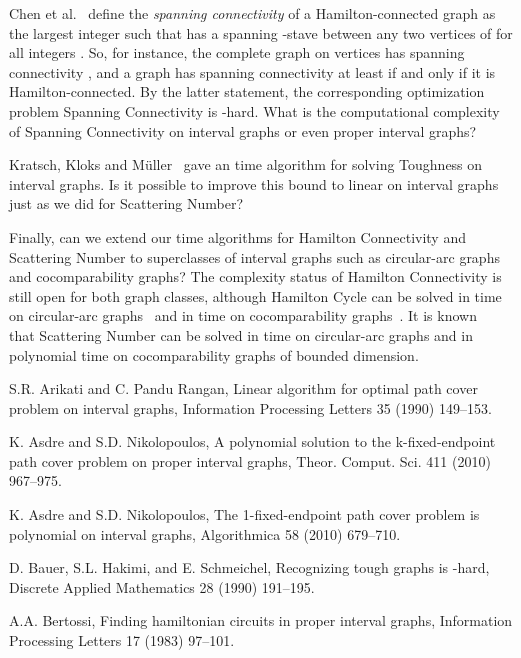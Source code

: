 \documentclass{llncs}
\begin{document}
\begin{theorem}
Chen et al.~\cite{CCLLW} define the {\em spanning connectivity\/} of a Hamilton-connected graph  as the largest integer  such that  has a spanning -stave between any two vertices of  for all integers . So, for instance, the complete graph on  vertices has spanning connectivity , and a graph has spanning connectivity at least  if and only if it is Hamilton-connected.
By the latter statement, the corresponding optimization problem {\sc Spanning Connectivity} is -hard.
What is the computational complexity of {\sc Spanning Connectivity} on interval graphs or even proper interval graphs?

Kratsch, Kloks and M\"uller~\cite{KKM94} gave an  time algorithm for solving {\sc Toughness} on interval graphs. Is it possible to improve this bound to linear on interval graphs just as we did for 
{\sc Scattering Number}?

Finally, can we extend our  time algorithms for {\sc Hamilton Connectivity} and {\sc Scattering Number} to superclasses of interval graphs such as circular-arc graphs and cocomparability graphs? 
The complexity status of {\sc Hamilton Connectivity} is still open for both graph classes, although {\sc Hamilton Cycle} can be solved in  time on circular-arc graphs~\cite{SCH92} and in  time on cocomparability graphs~\cite{DS94}. It is known~\cite{KKM94} that {\sc Scattering Number} can be solved in  time on circular-arc graphs and in polynomial time on cocomparability graphs of bounded dimension.


\begin{thebibliography}{10}

S.R. Arikati and C. Pandu Rangan, Linear algorithm for optimal path cover problem on interval graphs, Information Processing Letters 35 (1990) 149--153.

K. Asdre and S.D. Nikolopoulos, A polynomial solution to the k-fixed-endpoint path cover problem on proper interval graphs, Theor. Comput. Sci. 411 (2010) 967--975.

K. Asdre and S.D. Nikolopoulos, The 1-fixed-endpoint path cover problem is polynomial on interval graphs, Algorithmica 58 (2010) 679--710.

D. Bauer, S.L. Hakimi, and E. Schmeichel,
Recognizing tough graphs is -hard,
Discrete Applied Mathematics 28 (1990) 191--195.

A.A. Bertossi, Finding hamiltonian circuits in proper interval graphs, Information Processing Letters 17 (1983) 97--101.


\end{thebibliography}
\end{theorem}
\end{document}

